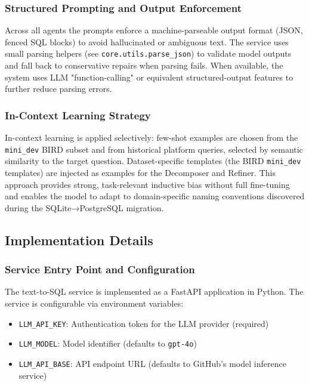 \subsubsection{Structured Prompting and Output Enforcement}

Across all agents the prompts enforce a machine-parseable output format (JSON, fenced SQL blocks) to avoid hallucinated or ambiguous text. The service uses small parsing helpers (see \texttt{core.utils.parse\_json}) to validate model outputs and fall back to conservative repairs when parsing fails. When available, the system uses LLM "function-calling" or equivalent structured-output features to further reduce parsing errors.

\subsubsection{In-Context Learning Strategy}

In-context learning is applied selectively: few-shot examples are chosen from the \texttt{mini\_dev} BIRD subset and from historical platform queries, selected by semantic similarity to the target question. Dataset-specific templates (the BIRD \texttt{mini\_dev} templates) are injected as examples for the Decomposer and Refiner. This approach provides strong, task-relevant inductive bias without full fine-tuning and enables the model to adapt to domain-specific naming conventions discovered during the SQLite→PostgreSQL migration.

\subsection{Implementation Details}

\subsubsection{Service Entry Point and Configuration}

The text-to-SQL service is implemented as a FastAPI application in Python. The service is configurable via environment variables:

\begin{itemize}
    \item \texttt{LLM\_API\_KEY}: Authentication token for the LLM provider (required)
    \item \texttt{LLM\_MODEL}: Model identifier (defaults to \texttt{gpt-4o})
    \item \texttt{LLM\_API\_BASE}: API endpoint URL (defaults to GitHub's model inference service)
\end{itemize}

